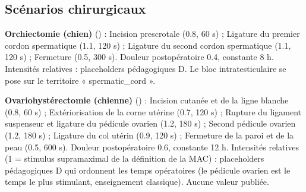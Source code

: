 \subsection{Scénarios chirurgicaux}
\textbf{Orchiectomie (chien)} (\evD) : Incision prescrotale (0.8, 60 s) ; Ligature du premier cordon spermatique (1.1, 120 s) ; Ligature du second cordon spermatique (1.1, 120 s) ; Fermeture (0.5, 300 s). Douleur postopératoire 0.4, constante 8 h. Intensités relatives : placeholders pédagogiques D. Le bloc intratesticulaire se pose sur le territoire « spermatic\_cord ».

\textbf{Ovariohystérectomie (chienne)} (\evD) : Incision cutanée et de la ligne blanche (0.8, 60 s) ; Extériorisation de la corne utérine (0.7, 120 s) ; Rupture du ligament suspenseur et ligature du pédicule ovarien (1.2, 180 s) ; Second pédicule ovarien (1.2, 180 s) ; Ligature du col utérin (0.9, 120 s) ; Fermeture de la paroi et de la peau (0.5, 600 s). Douleur postopératoire 0.6, constante 12 h. Intensités relatives (1 = stimulus supramaximal de la définition de la MAC) : placeholders pédagogiques D qui ordonnent les temps opératoires (le pédicule ovarien est le temps le plus stimulant, enseignement classique). Aucune valeur publiée.


